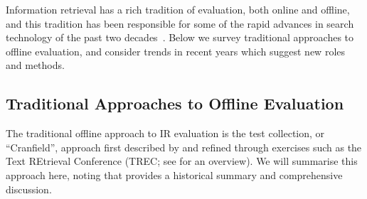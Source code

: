 Information retrieval has a rich tradition of evaluation, both online and offline, and this tradition has been responsible for some of the rapid advances in search technology of the past two decades~\citep{TRECimpact}. Below we survey traditional approaches to offline evaluation, and consider trends in recent years which suggest new roles and methods.

\subsection{Traditional Approaches to Offline Evaluation}
The traditional offline approach to IR evaluation is the test collection, or ``Cranfield'', approach first described by \cite{cleverdon67} and refined through exercises such as the Text REtrieval Conference (TREC; see \cite{voor:trec05} for an overview).  We will summarise this approach here, noting that \cite{INR-009} provides a historical summary and comprehensive discussion.

